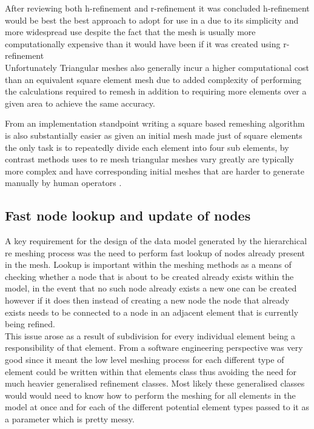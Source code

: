 \documentclass{article}
\begin{document}

After reviewing both h-refinement \cite{HandPRefinements} and r-refinement \cite{RRefinement} it was concluded h-refinement would be best the best approach to adopt for use in a due to its simplicity and more widespread use \cite{HandPRefinements} despite the fact that the mesh is usually more computationally expensive than it would have been if it was created using r-refinement \cite{RRefinement}\\ 

Unfortunately Triangular meshes also generally incur a higher computational cost than an equivalent square element mesh due to added complexity of performing the calculations required to remesh in addition to requiring more elements over a given area to achieve the same accuracy.

From an implementation standpoint writing a square based remeshing algorithm is also substantially easier as given an initial mesh made just of square elements the only task is to repeatedly divide each element into four sub elements, by contrast methods uses to re mesh triangular meshes vary greatly are typically more complex and have corresponding initial meshes that are harder to generate manually by human operators \cite{HandMeshing}.

\subsection{Fast node lookup and update of nodes}
A key requirement for the design of the data model generated by the hierarchical re meshing process was the need to perform fast lookup of nodes already present in the mesh. Lookup is important within the meshing methods as a means of checking whether a node that is about to be created already exists within the model, in the event that no such node already exists a new one can be created however if it does then instead of creating a new node the node that already exists needs to be connected to a node in an adjacent element that is currently being refined. \\

\noindent
This issue arose as a result of subdivision for every individual element being a responsibility of that element. From a software engineering perspective was very good since it meant the low level meshing process for each different type of element could be written within that elements class thus avoiding the need for much heavier generalised refinement classes. Most likely these generalised classes would would need to know how to perform the meshing for all elements in the model at once and for each of the different potential element types passed to it as a parameter which is pretty messy. \\ 
\end{document}
